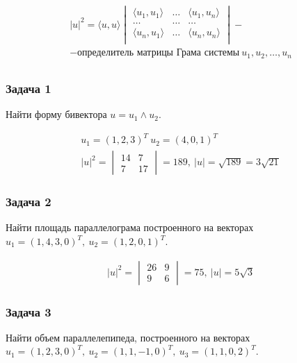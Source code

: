 $$\begin{gather}
|u|^{2} = \langle u,u \rangle \begin{vmatrix}
\langle u_{1},u_{1} \rangle & \dots & \langle u_{1},u_{n} \rangle \\
\dots & \dots & \dots \\
\langle u_{n},u_{1} \rangle & \dots & \langle u_{n},u_{n} \rangle \\
\end{vmatrix} - \\
- \text{определитель матрицы Грама системы} \ u_{1}, u_{2}, \dots, u_{n} \\
\end{gather}$$

\subsubsection{Задача 1}

Найти форму бивектора \(u = u_{1} \wedge u_{2}\).

$$\begin{gather}
u_{1} = (1,2,3)^{T} \ u_{2} = (4,0,1)^{T} \\
|u|^{2} = \begin{vmatrix}
14 & 7 \\
7 & 17
\end{vmatrix} = 189, \ |u| = \sqrt{ 189 } = 3\sqrt{ 21 }
\end{gather}$$

\subsubsection{Задача 2}

Найти площадь параллелограма построенного на векторах
\(u_{1} = (1,4,3,0)^{T}, \ u_{2} = (1,2,0,1)^{T}\).

$$\begin{gather}
|u|^{2} = \begin{vmatrix}
26 & 9 \\
9 & 6
\end{vmatrix} = 75, \ |u| = 5\sqrt{ 3 }
\end{gather}$$

\subsubsection{Задача 3}

Найти объем параллелепипеда, построенного на векторах
\(u_{1} = (1,2,3,0)^{T}, \ u_{2} = (1,1,-1,0)^{T}, \ u_{3} = (1,1,0,2)^{T}\).

